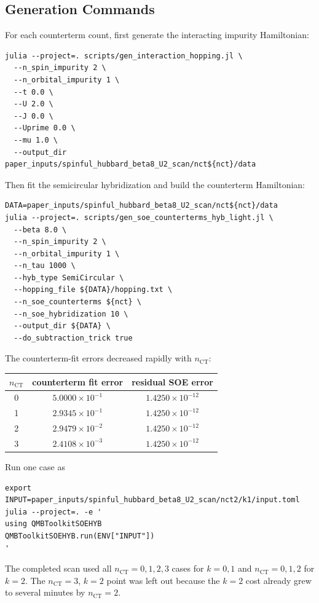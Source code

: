 \documentclass[11pt,a4paper]{article}
\theoremstyle{definition}
\theoremstyle{plain}
\begin{document}
\subsection{Generation Commands}

For each counterterm count, first generate the interacting impurity Hamiltonian:
\begin{verbatim}
julia --project=. scripts/gen_interaction_hopping.jl \
  --n_spin_impurity 2 \
  --n_orbital_impurity 1 \
  --t 0.0 \
  --U 2.0 \
  --J 0.0 \
  --Uprime 0.0 \
  --mu 1.0 \
  --output_dir paper_inputs/spinful_hubbard_beta8_U2_scan/nct${nct}/data
\end{verbatim}
Then fit the semicircular hybridization and build the counterterm Hamiltonian:
\begin{verbatim}
DATA=paper_inputs/spinful_hubbard_beta8_U2_scan/nct${nct}/data
julia --project=. scripts/gen_soe_counterterms_hyb_light.jl \
  --beta 8.0 \
  --n_spin_impurity 2 \
  --n_orbital_impurity 1 \
  --n_tau 1000 \
  --hyb_type SemiCircular \
  --hopping_file ${DATA}/hopping.txt \
  --n_soe_counterterms ${nct} \
  --n_soe_hybridization 10 \
  --output_dir ${DATA} \
  --do_subtraction_trick true
\end{verbatim}
The counterterm-fit errors decreased rapidly with $n_{\mathrm{CT}}$:
\begin{center}
\begin{tabular}{ccc}
\toprule
$n_{\mathrm{CT}}$ & counterterm fit error & residual SOE error \\
\midrule
0 & $5.0000\times 10^{-1}$ & $1.4250\times 10^{-12}$ \\
1 & $2.9345\times 10^{-1}$ & $1.4250\times 10^{-12}$ \\
2 & $2.9479\times 10^{-2}$ & $1.4250\times 10^{-12}$ \\
3 & $2.4108\times 10^{-3}$ & $1.4250\times 10^{-12}$ \\
\bottomrule
\end{tabular}
\end{center}

Run one case as
\begin{verbatim}
export INPUT=paper_inputs/spinful_hubbard_beta8_U2_scan/nct2/k1/input.toml
julia --project=. -e '
using QMBToolkitSOEHYB
QMBToolkitSOEHYB.run(ENV["INPUT"])
'
\end{verbatim}
The completed scan used all $n_{\mathrm{CT}}=0,1,2,3$ cases for $k=0,1$ and
$n_{\mathrm{CT}}=0,1,2$ for $k=2$.  The $n_{\mathrm{CT}}=3$, $k=2$ point was
left out because the $k=2$ cost already grew to several minutes by
$n_{\mathrm{CT}}=2$.
\end{document}

